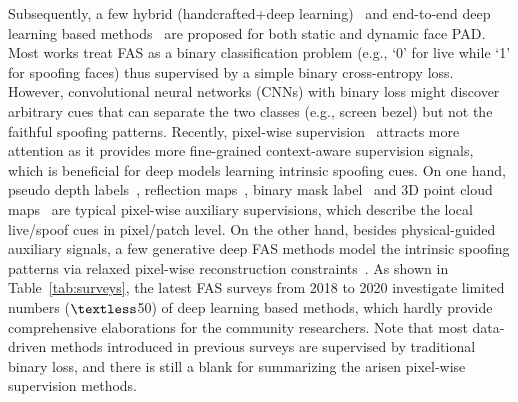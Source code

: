 \documentclass[10pt,journal,compsoc]{IEEEtran}
\begin{document}
Subsequently, a few hybrid (handcrafted+deep learning)~\cite{song2019discriminative,asim2017cnn,rehman2020enhancing,khammari2019robust} and end-to-end deep learning based methods~\cite{yu2020searching,yu2020face,Liu2018Learning,yang2019face,Atoum2018Face,yu2020multi,zhang2020casia} are proposed for both static and dynamic face PAD. Most works\cite{yang2014learn,Li2017An,Patel2016Cross,george2019deep,jourabloo2018face,jia20203d,li2020compactnet} treat FAS as a binary classification problem (e.g., `0' for live while `1' for spoofing faces) thus supervised by a simple binary cross-entropy loss. However, convolutional neural networks (CNNs) with binary loss might discover arbitrary cues that can separate the two classes (e.g., screen bezel) but not the faithful spoofing patterns. Recently, pixel-wise supervision~\cite{Atoum2018Face,Liu2018Learning,yu2020face,kim2019basn,george2019deep,yu2020fas2} attracts more attention as it provides more fine-grained context-aware supervision signals, which is beneficial for deep models learning intrinsic spoofing cues. On one hand, pseudo depth labels~\cite{Atoum2018Face,Liu2018Learning}, reflection maps~\cite{yu2020face,kim2019basn}, binary mask label~\cite{george2019deep,liu2019deep,sun2020face} and 3D point cloud maps~\cite{li3dpc} are typical pixel-wise auxiliary supervisions, which describe the local live/spoof cues in pixel/patch level. On the other hand, besides physical-guided auxiliary signals, a few generative deep FAS methods model the intrinsic spoofing patterns via relaxed pixel-wise reconstruction constraints~\cite{jourabloo2018face,feng2020learning,liu2020physics,qin2021meta}. As shown in Table~\ref{tab:surveys}, the latest FAS surveys from 2018 to 2020 investigate limited numbers ($\textless$50) of deep learning based methods, which hardly provide comprehensive elaborations for the community researchers. Note that most data-driven methods introduced in previous surveys are supervised by traditional binary loss, and there is still a blank for summarizing the arisen pixel-wise supervision methods. 


\end{document}
